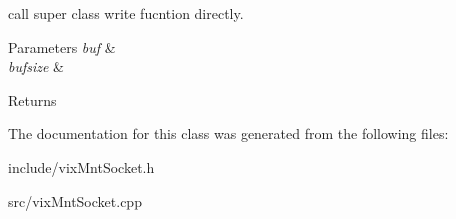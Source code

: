 call super class write fucntion directly. 


\begin{DoxyParams}{Parameters}
{\em buf} & \\
\hline
{\em bufsize} & \\
\hline
\end{DoxyParams}
\begin{DoxyReturn}{Returns}

\end{DoxyReturn}


The documentation for this class was generated from the following files\+:\begin{DoxyCompactItemize}
\item 
include/vix\+Mnt\+Socket.\+h\item 
src/vix\+Mnt\+Socket.\+cpp\end{DoxyCompactItemize}
